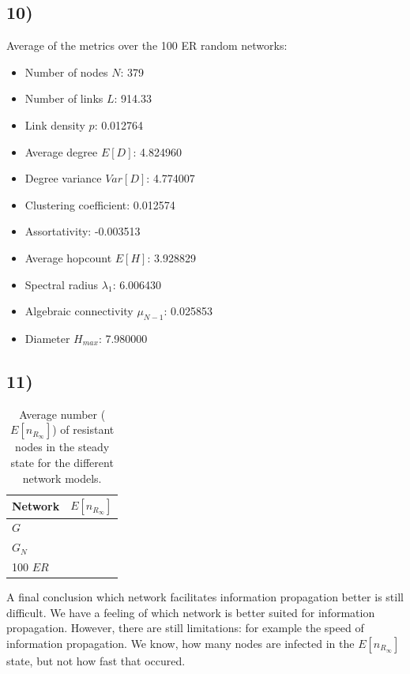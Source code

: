 \documentclass{article}
\begin{document}
\subsection*{10)}
Average of the metrics over the 100 ER random networks:
\begin{itemize}
 \item Number of nodes $N$: 379
 \item Number of links $L$: 914.33
 \item Link density $p$: 0.012764
 \item Average degree $E[D]$: 4.824960
 \item Degree variance $Var[D]$: 4.774007
 \item Clustering coefficient: 0.012574
 \item Assortativity: -0.003513
 \item Average hopcount $E[H]$: 3.928829
 \item Spectral radius $\lambda_1$: 6.006430
 \item Algebraic connectivity $\mu_{N-1}$: 0.025853
 \item Diameter $H_{max}$: 7.980000
\end{itemize}

\subsection*{11)}


\begin{table}[H]
  \centering
  \begin{tabular}{lr}
    \toprule
  Network    & $E[n_{R_\infty}]$ \\
    \midrule
    $G$      &                   \\
    $G_N$    &                   \\
    100 $ER$ &                   \\
\bottomrule
  \end{tabular}
  \caption{Average number ($E[n_{R_\infty}]$) of resistant nodes in
    the steady state for the different network models.}
\end{table}







% 
A final conclusion which network facilitates information propagation
better is still difficult.  We have a feeling of which network is
better suited for information propagation.  However, there are still
limitations: for example the speed of information propagation. We
know, how many nodes are infected in the $E[n_{R_\infty}]$ state, but
not how fast that occured.
\end{document}
